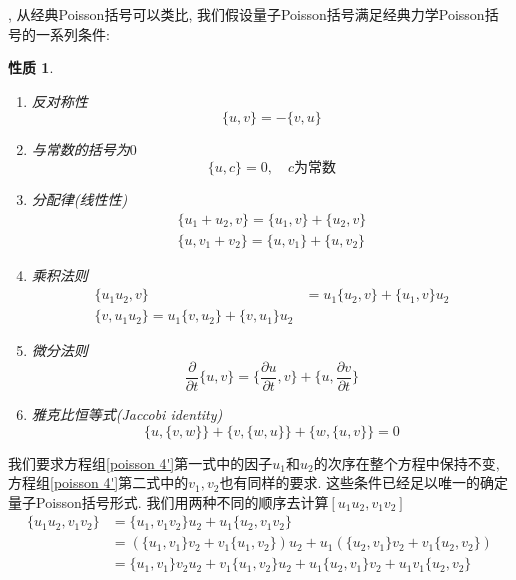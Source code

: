 \documentclass[a4paper,11pt]{book}
\newtheorem{property}{性质}[section]
\begin{document}
, 从经典Poisson括号可以类比, 我们假设量子Poisson括号满足经典力学Poisson括号的一系列条件:
\begin{property}
  \begin{enumerate}[(1)]
  \item 反对称性
  \begin{equation*}
    \{u,v\}=-\{v,u\}
  \end{equation*}
  \item 与常数的括号为$0$
  \begin{equation*}
    \{u,c\}=0,\quad\text{$c$为常数}
  \end{equation*}
  \item 分配律(线性性)
  \begin{equation*}
  \begin{split}
     \{u_1+u_2,v\}=\{u_1,v\}+\{u_2,v\}\\
     \{u,v_1+v_2\}=\{u,v_1\}+\{u,v_2\}
  \end{split}
  \end{equation*}
  \item\label{poisson 4'} 乘积法则
  \begin{equation*}
    \begin{split}
       \{u_1u_2,v\}&=u_1\{u_2,v\}+\{u_1,v\}u_2\\
       \{v,u_1u_2\}=u_1\{v,u_2\}+\{v,u_1\}u_2
    \end{split}
  \end{equation*}
  \item 微分法则
  \begin{equation*}
    \frac{\partial}{\partial t}\{u,v\}=\{\frac{\partial u}{\partial t},v\}+\{u,\frac{\partial v}{\partial t}\}
  \end{equation*}
  \item 雅克比恒等式(Jaccobi identity)
  \begin{equation*}
    \{u,\{v,w\}\}+\{v,\{w,u\}\}+\{w,\{u,v\}\}=0
  \end{equation*}
\end{enumerate}
\end{property}
我们要求方程组\ref{poisson 4'}第一式中的因子$u_1$和$u_2$的次序在整个方程中保持不变,方程组\ref{poisson 4'}第二式中的$v_1,v_2$也有同样的要求. 这些条件已经足以唯一的确定量子Poisson括号形式. 我们用两种不同的顺序去计算$[u_1u_2,v_1v_2]$
\begin{equation*}
  \begin{split}
     \{u_1u_2,v_1v_2\} & =\{u_1,v_1v_2\}u_2+u_1\{u_2,v_1v_2\} \\
       & =\left(\{u_1,v_1\}v_2+v_1\{u_1,v_2\}\right)u_2+u_1\left(\{u_2,v_1\}v_2+v_1\{u_2,v_2\}\right) \\
       & =\{u_1,v_1\}v_2u_2+v_1\{u_1,v_2\}u_2+u_1\{u_2,v_1\}v_2+u_1v_1\{u_2,v_2\}
  \end{split}
\end{equation*}
\end{document}
